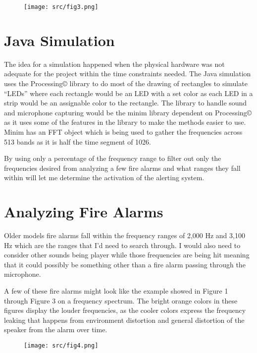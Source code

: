 \documentclass[conference]{IEEEtran}
\begin{document}
\begin{figure}[H]
	\centering
	\texttt{[image: src/fig3.png]}
\end{figure}


\section{Java Simulation}
The idea for a simulation happened when the physical hardware was not adequate for the project within the time constraints needed. The Java simulation uses the Processing© library to do most of the drawing of rectangles to simulate “LEDs” where each rectangle would be an LED with a set color as each LED in a strip would be an assignable color to the rectangle. The library to handle sound and microphone capturing would be the minim library dependent on Processing© as it uses some of the features in the library to make the methods easier to use. Minim has an FFT object which is being used to gather the frequencies across 513 bands as it is half the time segment of 1026.

By using only a percentage of the frequency range to filter out only the frequencies desired from analyzing a few fire alarms and what ranges they fall within will let me determine the activation of the alerting system.


\section{Analyzing Fire Alarms}
Older models fire alarms fall within the frequency ranges of 2,000 Hz and 3,100 Hz which are the ranges that I’d need to search through. I would also need to consider other sounds being player while those frequencies are being hit meaning that it could possibly be something other than a fire alarm passing through the microphone.

A few of these fire alarms might look like the example showed in Figure 1 through Figure 3 on a frequency spectrum. The bright orange colors in these figures display the louder frequencies, as the cooler colors express the frequency leaking that happens from environment distortion and general distortion of the speaker from the alarm over time.

\begin{figure}[H]
	\centering
	\texttt{[image: src/fig4.png]}
\end{figure}
\end{document}
